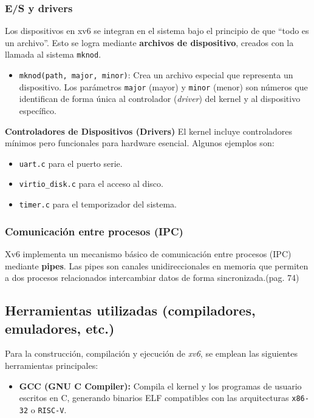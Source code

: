 \begin{itemize}
\subsubsection*{E/S y drivers}
Los dispositivos en xv6 se integran en el sistema bajo el principio de que ``todo es un archivo''. Esto se logra mediante \textbf{archivos de dispositivo}, creados con la llamada al sistema \texttt{mknod}.

\begin{itemize}
    \item \texttt{mknod(path, major, minor)}: Crea un archivo especial que representa un dispositivo. Los parámetros \texttt{major} (mayor) y \texttt{minor} (menor) son números que identifican de forma única al controlador (\textit{driver}) del kernel y al dispositivo específico.
\end{itemize}

\textbf{Controladores de Dispositivos (Drivers)}
El kernel incluye controladores mínimos pero funcionales para hardware esencial. Algunos ejemplos son:

\begin{itemize}
    \item \texttt{uart.c} para el puerto serie.
    \item \texttt{virtio\_disk.c} para el acceso al disco.
    \item \texttt{timer.c} para el temporizador del sistema.
\end{itemize}

\subsubsection*{Comunicación entre procesos (IPC)}
Xv6 implementa un mecanismo básico de comunicación entre procesos (IPC) mediante \textbf{pipes}. Las pipes son canales unidireccionales en memoria que permiten a dos procesos relacionados intercambiar datos de forma sincronizada.\citep{xv6_mit}(pag. 74)

\subsection{Herramientas utilizadas (compiladores, emuladores, etc.)}

Para la construcción, compilación y ejecución de \textit{xv6}, se emplean las siguientes herramientas principales:

\begin{itemize}
    \item \textbf{GCC (GNU C Compiler):} Compila el kernel y los programas de usuario escritos en C, generando binarios ELF compatibles con las arquitecturas \texttt{x86-32} o \texttt{RISC-V}.
    

\end{itemize}
\end{itemize}
